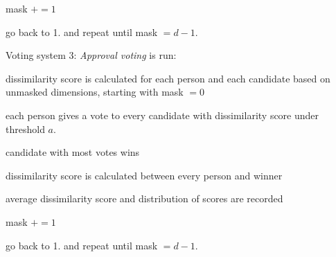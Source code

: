 \begin{enum_tight}
\begin{enum_tight}
\item mask $+= 1$
\item go back to 1. and repeat until mask $= d-1$.
\end{enum_tight}
\item Voting system 3: {\it Approval voting} is run:
\begin{enum_tight}
\item dissimilarity score is calculated for each person and each candidate based on unmasked dimensions, starting with mask $=0$
\item each person gives a vote to every candidate with dissimilarity score under threshold $a$.
\item candidate with most votes wins
\item dissimilarity score is calculated between every person and winner
\item average dissimilarity score and distribution of scores are recorded
\item mask $+= 1$
\item go back to 1. and repeat until mask $= d-1$.
\end{enum_tight}
\end{enum_tight}
